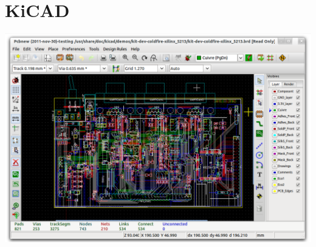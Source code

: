 \chapter{KiCAD}

\noindent\includegraphics[height=0.5\textheight]{kicad/kicad_pcbnew.png}
















% 
% 
% 
% 
% 
% 
% 
% 
% 
% 
% 
% 
% 
% 
% 
